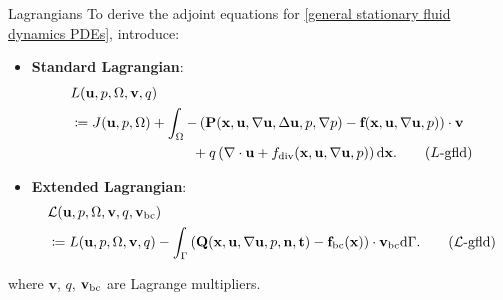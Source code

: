 \documentclass[10pt
hyperref={
    pdfauthor={Hong Quan Ba Nguyen},
    pdftitle={Optimal Shape Design of Air Ducts in Combustion Engines: Design a General Framework},
    pdfsubject={Talk},
    pdfcreator={LaTeX},
}
]{beamer}
\begin{document}
\begin{frame}{Lagrangians}
    To derive the adjoint equations for \eqref{general stationary fluid dynamics PDEs}, introduce:
    \begin{itemize}
        \item \textbf{Standard Lagrangian}:
        \begin{align}
            &L(\textbf{u},p,\Omega,\textbf{v},q)\nonumber\\
            &\coloneqq J(\textbf{u},p,\Omega) + \int_\Omega -\left(\textbf{P}(\textbf{x},\textbf{u},\nabla\textbf{u},\Delta\textbf{u},p,\nabla p) - \textbf{f}(\textbf{x},\textbf{u},\nabla\textbf{u},p)\right)\cdot\textbf{v}\nonumber\\
            &\hspace{3.05cm}+ q\left(\nabla\cdot\textbf{u} + f_{\rm div}(\textbf{x},\textbf{u},\nabla\textbf{u},p)\right){\rm d}\textbf{x}.\label{Lagrangian for general stationary fluid dynamics PDEs}
            \tag{$L$-gfld}
        \end{align}
        \item \textbf{Extended Lagrangian}:
        \begin{align}            
            &\mathcal{L}(\textbf{u},p,\Omega,\textbf{v},q,\textbf{v}_{\rm bc})\nonumber\\
            &\coloneqq L(\textbf{u},p,\Omega,\textbf{v},q) - \int_\Gamma \left(\textbf{Q}(\textbf{x},\textbf{u},\nabla\textbf{u},p,\textbf{n},\textbf{t}) - \textbf{f}_{\rm bc}(\textbf{x})\right)\cdot\textbf{v}_{\rm bc}{\rm d}\Gamma.\label{extended Lagrangian for general stationary fluid dynamics PDEs}
            \tag{$\mathcal{L}$-gfld}
        \end{align}
    \end{itemize}
    where $\textbf{v}$, $q$, $\textbf{v}_{\rm bc}$ are Lagrange multipliers.
\end{frame}
\end{document}
